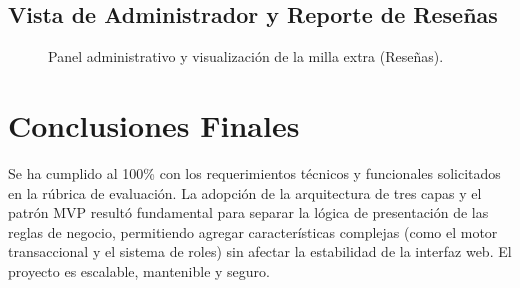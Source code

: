 \documentclass[11pt, a4paper]{article}
\begin{document}
\subsection{Vista de Administrador y Reporte de Reseñas}
\begin{figure}[htbp]
  \centering
  \caption{Panel administrativo y visualización de la milla extra (Reseñas).}
\end{figure}

\section{Conclusiones Finales}
Se ha cumplido al 100\% con los requerimientos técnicos y funcionales solicitados en la rúbrica de evaluación. La adopción de la arquitectura de tres capas y el patrón MVP resultó fundamental para separar la lógica de presentación de las reglas de negocio, permitiendo agregar características complejas (como el motor transaccional y el sistema de roles) sin afectar la estabilidad de la interfaz web. El proyecto es escalable, mantenible y seguro.
\end{document}
